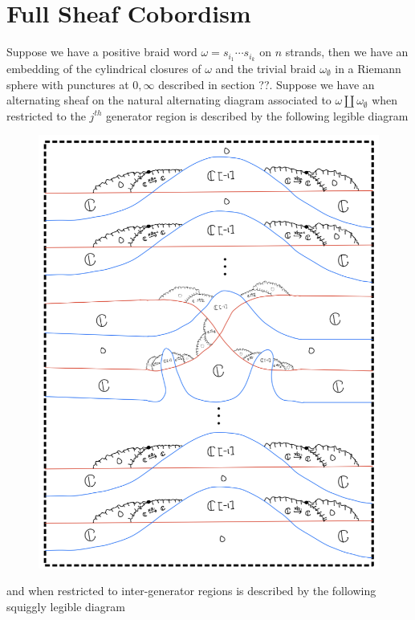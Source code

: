 \section{Full Sheaf Cobordism}
Suppose we have a positive braid word $\omega = s_{i_1}\cdots s_{i_k}$ on $n$ strands, then we have an embedding of the cylindrical closures of $\omega$ and the trivial braid $\omega_{\emptyset}$ in a Riemann sphere with punctures at $0,\infty$ described in section ??. Suppose we have an alternating sheaf on the natural alternating diagram associated to $\omega \coprod \omega_\emptyset$ when restricted to the $j^{th}$ generator region is described by the following legible diagram
\begin{figure}[H]
    \centering
    \includegraphics[scale = 0.95]{diagrams/cobord_full/1.png}
    \caption{}
    \label{fig:your-label}
\end{figure}
and when restricted to inter-generator regions is described by the following squiggly legible diagram
